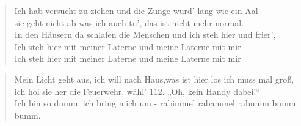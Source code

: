 \documentclass[9pt,a4paper,oneside, onecolumn]{article}
\begin{document}
\begin{verse}
Ich hab versucht zu ziehen und die Zunge wurd' lang wie ein Aal\\
sie geht nicht ab was ich auch tu', das ist nicht mehr normal.\\
In den Häusern da schlafen die Menschen und ich steh hier und frier',\\
Ich steh hier mit meiner Laterne und meine Laterne mit mir\\
Ich steh hier mit meiner Laterne und meine Laterne mit mir\\
\end{verse}

\begin{verse}
Mein Licht geht aus, ich will nach Haus,was ist hier los ich muss mal groß,\\
ich hol sie her die Feuerwehr, wähl' 112. „Oh, kein Handy dabei!“\\
Ich bin so dumm, ich bring mich um - rabimmel rabammel rabumm bumm bumm.\\
\end{verse}
\end{document}
